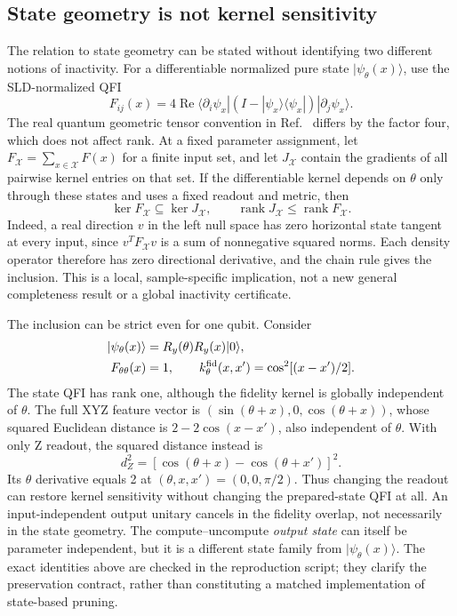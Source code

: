 \subsection{State geometry is not kernel sensitivity}
\label{sec:qfi_scope}
The relation to state geometry can be stated without identifying two
different notions of inactivity. For a differentiable normalized pure
state $|\psi_\theta(x)\rangle$, use the SLD-normalized QFI
\begin{equation}
 F_{ij}(x)=4\operatorname{Re}\langle\partial_i\psi_x|
 (I-|\psi_x\rangle\langle\psi_x|)|\partial_j\psi_x\rangle.
\end{equation}
The real quantum geometric tensor convention in Ref.~\cite{haug}
differs by the factor four, which does not affect rank. At a fixed
parameter assignment, let $F_{\mathcal X}=\sum_{x\in\mathcal X}F(x)$
for a finite input set, and let $J_{\mathcal X}$ contain the gradients
of all pairwise kernel entries on that set. If the differentiable
kernel depends on $\theta$ only through these states and uses a fixed
readout and metric, then
\begin{equation}
 \ker F_{\mathcal X}\subseteq\ker J_{\mathcal X},\qquad
 \operatorname{rank}J_{\mathcal X}\leq\operatorname{rank}F_{\mathcal X}.
 \label{eq:qfi_inclusion}
\end{equation}
Indeed, a real direction $v$ in the left null space has zero horizontal
state tangent at every input, since $v^TF_{\mathcal X}v$ is a sum of
nonnegative squared norms. Each density operator therefore has zero
directional derivative, and the chain rule gives the inclusion.
This is a local, sample-specific implication, not a new general
completeness result or a global inactivity certificate.

The inclusion can be strict even for one qubit. Consider
\begin{align}
 |\psi_\theta(x)\rangle&=R_y(\theta)R_y(x)|0\rangle,\\
 F_{\theta\theta}(x)&=1,\qquad
 k^{\rm fid}_\theta(x,x')=\cos^2[(x-x')/2].
\end{align}
The state QFI has rank one, although the fidelity kernel is globally
independent of $\theta$. The full XYZ feature vector is
$(\sin(\theta+x),0,\cos(\theta+x))$, whose squared Euclidean
distance is $2-2\cos(x-x')$, also independent of $\theta$.
With only Z readout, the squared distance instead is
\begin{equation}
 d_Z^2=[\cos(\theta+x)-\cos(\theta+x')]^2.
\end{equation}
Its $\theta$ derivative equals 2 at $(\theta,x,x')=(0,0,\pi/2)$.
Thus changing the readout can restore kernel sensitivity without
changing the prepared-state QFI at all. An input-independent output
unitary cancels in the fidelity overlap, not necessarily in the state
geometry. The compute--uncompute \emph{output state} can itself be
parameter independent, but it is a different state family from
$|\psi_\theta(x)\rangle$. The exact identities above are checked in the
reproduction script; they clarify the preservation contract, rather
than constituting a matched implementation of state-based pruning.
